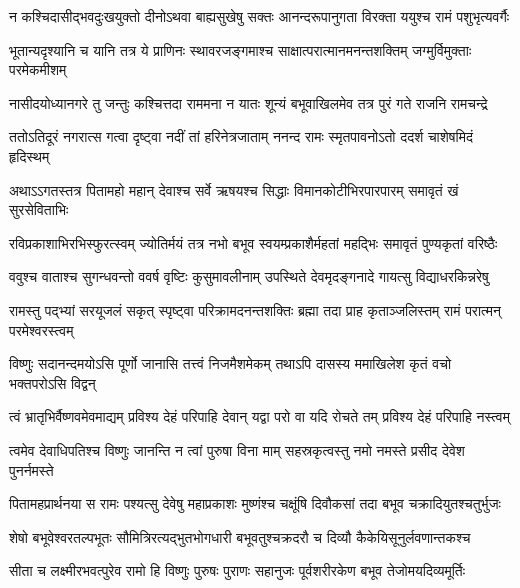 \fourlineindentedshloka
{न कश्चिदासीद्भवदुःखयुक्तो}
{दीनोऽथवा बाह्यसुखेषु सक्तः}
{आनन्दरूपानुगता विरक्ता}
{ययुश्च रामं पशुभृत्यवर्गैः} %

\fourlineindentedshloka
{भूतान्यदृश्यानि च यानि तत्र}
{ये प्राणिनः स्थावरजङ्गमाश्च}
{साक्षात्परात्मानमनन्तशक्तिम्}
{जग्मुर्विमुक्ताः परमेकमीशम्} %

\fourlineindentedshloka
{नासीदयोध्यानगरे तु जन्तुः}
{कश्चित्तदा राममना न यातः}
{शून्यं बभूवाखिलमेव तत्र}
{पुरं गते राजनि रामचन्द्रे} %

\fourlineindentedshloka
{ततोऽतिदूरं नगरात्स गत्वा}
{दृष्ट्वा नदीं तां हरिनेत्रजाताम्}
{ननन्द रामः स्मृतपावनोऽतो}
{ददर्श चाशेषमिदं हृदिस्थम्} %

\fourlineindentedshloka
{अथाऽऽगतस्तत्र पितामहो महान्}
{देवाश्च सर्वे ऋषयश्च सिद्धाः}
{विमानकोटीभिरपारपारम्}
{समावृतं खं सुरसेविताभिः} %

\fourlineindentedshloka
{रविप्रकाशाभिरभिस्फुरत्स्वम्}
{ज्योतिर्मयं तत्र नभो बभूव}
{स्वयम्प्रकाशैर्महतां महद्भिः}
{समावृतं पुण्यकृतां वरिष्ठैः} %

\fourlineindentedshloka
{ववुश्च वाताश्च सुगन्धवन्तो}
{ववर्ष वृष्टिः कुसुमावलीनाम्}
{उपस्थिते देवमृदङ्गनादे}
{गायत्सु विद्याधरकिन्नरेषु} %

\fourlineindentedshloka
{रामस्तु पद्भ्यां सरयूजलं सकृत्}
{स्पृष्ट्वा परिक्रामदनन्तशक्तिः}
{ब्रह्मा तदा प्राह कृताञ्जलिस्तम्}
{रामं परात्मन् परमेश्वरस्त्वम्} %

\fourlineindentedshloka
{विष्णुः सदानन्दमयोऽसि पूर्णो}
{जानासि तत्त्वं निजमैशमेकम्}
{तथाऽपि दासस्य ममाखिलेश}
{कृतं वचो भक्तपरोऽसि विद्वन्} %

\fourlineindentedshloka
{त्वं भ्रातृभिर्वैष्णवमेवमाद्यम्}
{प्रविश्य देहं परिपाहि देवान्}
{यद्वा परो वा यदि रोचते तम्}
{प्रविश्य देहं परिपाहि नस्त्वम्} %

\fourlineindentedshloka
{त्वमेव देवाधिपतिश्च विष्णुः}
{जानन्ति न त्वां पुरुषा विना माम्}
{सहस्रकृत्वस्तु नमो नमस्ते}
{प्रसीद देवेश पुनर्नमस्ते} %

\fourlineindentedshloka
{पितामहप्रार्थनया स रामः}
{पश्यत्सु देवेषु महाप्रकाशः}
{मुष्णंश्च चक्षूंषि दिवौकसां तदा}
{बभूव चक्रादियुतश्चतुर्भुजः} %

\fourlineindentedshloka
{शेषो बभूवेश्वरतल्पभूतः}
{सौमित्रिरत्यद्भुतभोगधारी}
{बभूवतुश्चक्रदरौ च दिव्यौ}
{कैकेयिसूनुर्लवणान्तकश्च} %

\fourlineindentedshloka
{सीता च लक्ष्मीरभवत्पुरेव}
{रामो हि विष्णुः पुरुषः पुराणः}
{सहानुजः पूर्वशरीरकेण}
{बभूव तेजोमयदिव्यमूर्तिः} %

